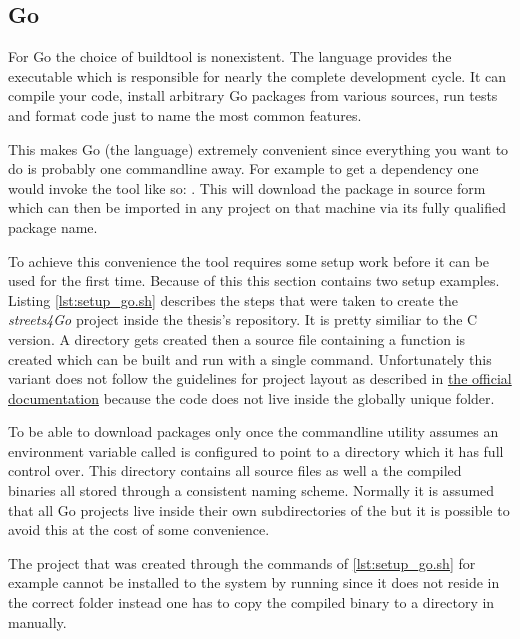 \subsection{Go}
\label{subsec:Implementation::Setup::Go}

For Go the choice of buildtool is nonexistent. The language provides the  executable which is responsible for nearly the complete development cycle. It can compile your code, install arbitrary Go packages from various sources, run tests and format code just to name the most common features.

This makes Go (the language) extremely convenient since everything you want to do is probably one commandline away. For example to get a dependency one would invoke the tool like so: . This will download the package in source form which can then be imported in any project on that machine via its fully qualified package name.

To achieve this convenience the  tool requires some setup work before it can be used for the first time. Because of this this section contains two setup examples.
\\


Listing \ref{lst:setup_go.sh} describes the steps that were taken to create the \textit{streets4Go} project inside the thesis's repository. It is pretty similiar to the C version. A directory gets created then a source file containing a  function is created which can be built and run with a single command. Unfortunately this variant does not follow the guidelines for project layout as described in \href{https://golang.org/doc/code.html#Workspaces}{the official documentation} because the code does not live inside the globally unique  folder.

To be able to download packages only once the  commandline utility assumes an environment variable called  is configured to point to a directory which it has full control over. This directory contains all source files as well a the compiled binaries all stored through a consistent naming scheme. Normally it is assumed that all Go projects live inside their own subdirectories of the  but it is possible to avoid this at the cost of some convenience.

The project that was created through the commands of \autoref{lst:setup_go.sh} for example cannot be installed to the system by running  since it does not reside in the correct folder instead one has to copy the compiled binary to a directory in  manually.


